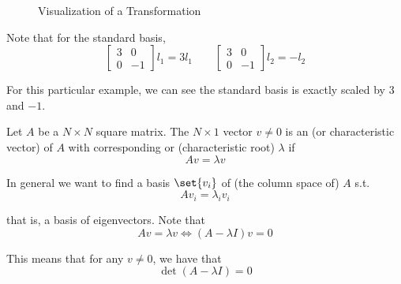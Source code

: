 \documentclass{article}
\begin{document}
\begin{figure}[!ht]
  \centering
  \caption{Visualization of a Transformation}
  \label{fig:visualization_of_a_transformation}
\end{figure}

Note that for the standard basis,
\[
  \left[\begin{matrix}
    3 & 0 \\ 0 & -1
  \end{matrix}\right]
  l_1
  =
  3l_1
  \quad\quad
  \left[\begin{matrix}
    3 & 0 \\ 0 & -1
  \end{matrix}\right]
  l_2
  =
  -l_2
\]

For this particular example, we can see the standard basis is exactly scaled by $3$ and $-1$.
\begin{definition}
  Let $A$ be a $N \times N$ square matrix. The $N \times 1$ vector $v \ne 0$ is an  (or characteristic vector) of $A$ with corresponding  or (characteristic root) $\lambda$ if
  \[
    A v = \lambda v
  \]
\end{definition}

In general we want to find a basis $\set{v_i}$ of (the column space of) $A$ s.t.
\[
  Av_i = \lambda_i v_i
\]

that is, a basis of eigenvectors. Note that
\[
  Av = \lambda v
  \iff
  (A - \lambda I) v = 0
\]

This means that for any $v \ne 0$, we have that
\[
  \det(A - \lambda I) = 0
\]
\end{document}
